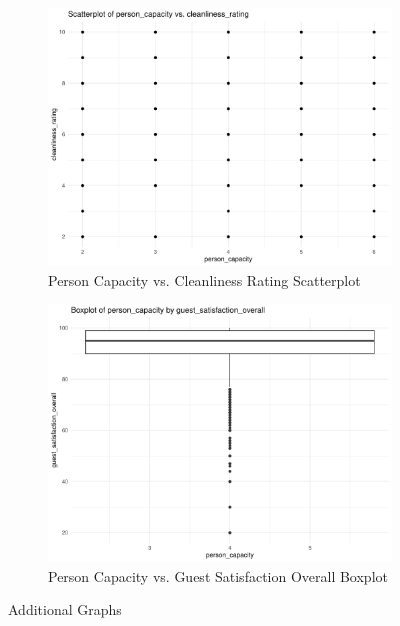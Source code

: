 \documentclass[12pt, letterpaper]{article}
\begin{document}
\begin{figure}[H]
  \vspace{0.05\textwidth}

  \begin{subfigure}{0.45\textwidth}
    \includegraphics[width=\linewidth]{person_capacity_cleanliness_rating__scatterplot.pdf}
    \caption{Person Capacity vs. Cleanliness Rating Scatterplot}
    \label{fig:person_capacity_cleanliness_rating__scatterplot}
  \end{subfigure}
  \hspace{0.05\textwidth}
  \begin{subfigure}{0.45\textwidth}
    \includegraphics[width=\linewidth]{person_capacity_guest_satisfaction_overall__boxplot.pdf}
    \caption{Person Capacity vs. Guest Satisfaction Overall Boxplot}
    \label{fig:person_capacity_guest_satisfaction_overall__boxplot}
  \end{subfigure}
  
  \caption{Additional Graphs}
  \label{fig:additional_graphs_2}
\end{figure}
\end{document}
